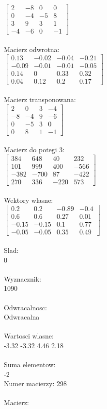 \documentclass[a4paper,12pt]{article}
\begin{document}
$\begin{bmatrix} 2&-8&0&0\\0&-4&-5&8\\3&9&3&1\\-4&-6&0&-1 \end{bmatrix}$
\\
\\
Macierz odwrotna:\\

$\begin{bmatrix} 0.13&-0.02&-0.04&-0.21\\-0.09&-0.01&-0.01&-0.05\\0.14&0&0.33&0.32\\0.04&0.12&0.2&0.17 \end{bmatrix}$
\\
\\
Macierz transponowana:\\

$\begin{bmatrix} 2&0&3&-4\\-8&-4&9&-6\\0&-5&3&0\\0&8&1&-1 \end{bmatrix}$
\\
\\
Macierz do potegi 3:\\

$\begin{bmatrix} 384&648&40&232\\101&999&400&-566\\-382&-700&87&-422\\270&336&-220&573 \end{bmatrix}$
\\
\\
Wektory wlasne:\\

$\begin{bmatrix} 0.2&0.2&-0.89&-0.4\\0.6&0.6&0.27&0.01\\-0.15&-0.15&0.1&0.77\\-0.05&-0.05&0.35&0.49 \end{bmatrix}$
\\
\\
Slad:\\
0
\\
\\
Wyznacznik:\\
1090
\\
\\
Odwracalnosc:\\
Odwracalna
\\
\\
Wartosci wlasne:\\
-3.32 -3.32 4.46 2.18
\\
\\
Suma elementow:\\
-2
\\
\newpage
Numer macierzy:
298
\\
\\
Macierz:\\
\end{document}
